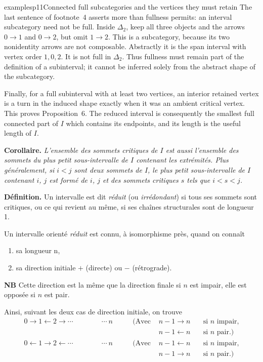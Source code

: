 \begin{dcomment}{examples}{p11}{Connected full subcategories and the vertices they must retain}
The last sentence of footnote~4 asserts more than fullness permits: an interval subcategory need not be full. Inside $\Delta_2$, keep all three objects and the arrows $0\to1$ and $0\to2$, but omit $1\to2$. This is a subcategory, because its two nonidentity arrows are not composable. Abstractly it is the span interval with vertex order $1,0,2$. It is not full in $\Delta_2$. Thus fullness must remain part of the definition of a subinterval; it cannot be inferred solely from the abstract shape of the subcategory.

Finally, for a full subinterval with at least two vertices, an interior retained vertex is a turn in the induced shape exactly when it was an ambient critical vertex. This proves Proposition~6. The reduced interval is consequently the smallest full connected part of $I$ which contains its endpoints, and its length is the useful length of $I$.
\end{dcomment}


\textbf{Corollaire.} \textit{L'ensemble des sommets critiques de $I$ est aussi l'ensemble des sommets du plus petit sous-intervalle de $I$ contenant les extrémités. Plus généralement, si $i < j$ sont deux sommets de $I$, le plus petit sous-intervalle de $I$ contenant $i$, $j$ est formé de $i$, $j$ et des sommets critiques $s$ tels que $i < s < j$.}

\textbf{Définition.} Un intervalle est dit \textit{réduit} (ou \textit{irrédondant}) si tous ses sommets sont critiques, ou ce qui revient au même, si ses chaînes structurales sont de longueur 1.

Un intervalle orienté \textit{réduit} est connu, à isomorphisme près, quand on connaît
\begin{enumerate}
\item[a)] sa longueur $\mathrm{n}$,
\item[b)] sa direction initiale $+$ (directe) ou $-$ (rétrograde).
\end{enumerate}

\textbf{NB} Cette direction est la même que la direction finale si $n$ est impair, elle est opposée si $n$ est pair.

Ainsi, suivant les deux cas de direction initiale, on trouve
\[
\begin{aligned}
0 \longrightarrow 1 \longleftarrow 2 \longrightarrow \cdots \qquad\qquad \cdots\ n & \qquad (\text{Avec } & n-1 \longrightarrow n & \quad \text{si } n \text{ impair,}\\
& & n-1 \longleftarrow n & \quad \text{si } n \text{ pair.)}\\
0 \longleftarrow 1 \longrightarrow 2 \longleftarrow \cdots \qquad\qquad \cdots\ n & \qquad (\text{Avec } & n-1 \longleftarrow n & \quad \text{si } n \text{ impair,}\\
& & n-1 \longrightarrow n & \quad \text{si } n \text{ pair.)}
\end{aligned}
\]

